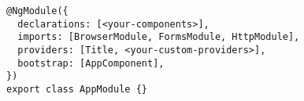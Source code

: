 \begin{verbatim}
@NgModule({
  declarations: [<your-components>],
  imports: [BrowserModule, FormsModule, HttpModule],
  providers: [Title, <your-custom-providers>],
  bootstrap: [AppComponent],
})
export class AppModule {}
\end{verbatim}
